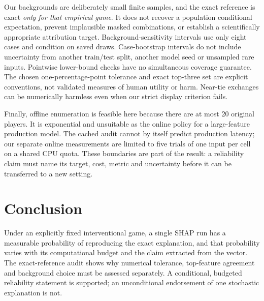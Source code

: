 Our backgrounds are deliberately small finite samples, and the exact reference is exact \emph{only for that empirical game}. It does not recover a population conditional expectation, prevent implausible masked combinations, or establish a scientifically appropriate attribution target. Background-sensitivity intervals use only eight cases and condition on saved draws. Case-bootstrap intervals do not include uncertainty from another train/test split, another model seed or unsampled rare inputs. Pointwise lower-bound checks have no simultaneous coverage guarantee. The chosen one-percentage-point tolerance and exact top-three set are explicit conventions, not validated measures of human utility or harm. Near-tie exchanges can be numerically harmless even when our strict display criterion fails.

Finally, offline enumeration is feasible here because there are at most 20 original players. It is exponential and unsuitable as the online policy for a large-feature production model. The cached audit cannot by itself predict production latency; our separate online measurements are limited to five trials of one input per cell on a shared CPU quota. These boundaries are part of the result: a reliability claim must name its target, cost, metric and uncertainty before it can be transferred to a new setting.

\section{Conclusion}
Under an explicitly fixed interventional game, a single SHAP run has a measurable probability of reproducing the exact explanation, and that probability varies with its computational budget and the claim extracted from the vector. The exact-reference audit shows why numerical tolerance, top-feature agreement and background choice must be assessed separately. A conditional, budgeted reliability statement is supported; an unconditional endorsement of one stochastic explanation is not.
